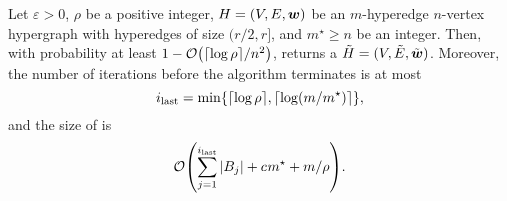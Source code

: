 \begin{lemma} \label{lem:spectral_sparsify}
Let \( \varepsilon > 0 \), \( \rho \) be a positive integer, \( { H} = (V, E, \boldsymbol{w}) \) be an \( m \)-hyperedge \( n \)-vertex hypergraph with hyperedges of size \( (r/2, r] \), and \( m^\star \geq n \) be an integer.
Then, with probability at least \( 1 - \atmost{ \lceil \log \rho \rceil /n^2} \),  returns a \SpectralHypersparsifier{} \( { \tilde H} = (V, \tilde{E}, \tilde{\boldsymbol{w}}) \).
Moreover, the number of iterations before the algorithm terminates is at most
\begin{equation*}
\ilast = \min\left\{ \lceil \log \rho \rceil, \lceil \log \left( m / m^\star \right) \rceil \right\},
\end{equation*}
and the size of  is 
\begin{equation} \label{eq:SizeSparsifier}
\atmost{ \sum _{j = 1} ^ \ilast |\hypergraph{B_j}| +  \ConstantSize m^\star + m / \rho }.
\end{equation}


\end{lemma}
